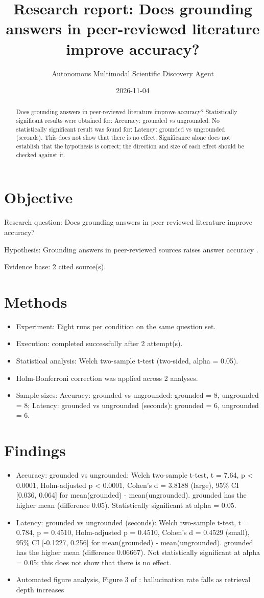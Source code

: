 \documentclass[11pt]{article}
\title{Research report: Does grounding answers in peer-reviewed literature improve accuracy?}
\author{Autonomous Multimodal Scientific Discovery Agent}
\date{2026-11-04}
\begin{document}
\maketitle
\begin{abstract}
Does grounding answers in peer-reviewed literature improve accuracy? Statistically significant results were obtained for: Accuracy: grounded vs ungrounded. No statistically significant result was found for: Latency: grounded vs ungrounded (seconds). This does not show that there is no effect. Significance alone does not establish that the hypothesis is correct; the direction and size of each effect should be checked against it.
\end{abstract}
\section{Objective}
Research question: Does grounding answers in peer-reviewed literature improve accuracy?

Hypothesis: Grounding answers in peer-reviewed sources raises answer accuracy \cite{src1}\cite{src2}.

Evidence base: 2 cited source(s).

\section{Methods}
\begin{itemize}
\item Experiment: Eight runs per condition on the same question set.
\item Execution: completed successfully after 2 attempt(s).
\item Statistical analysis: Welch two-sample t-test (two-sided, alpha = 0.05).
\item Holm-Bonferroni correction was applied across 2 analyses.
\item Sample sizes: Accuracy: grounded vs ungrounded: grounded = 8, ungrounded = 8; Latency: grounded vs ungrounded (seconds): grounded = 6, ungrounded = 6.
\end{itemize}
\section{Findings}
\begin{itemize}
\item Accuracy: grounded vs ungrounded: Welch two-sample t-test, t = 7.64, p < 0.0001, Holm-adjusted p < 0.0001, Cohen's d = 3.8188 (large), 95\% CI [0.036, 0.064] for mean(grounded) - mean(ungrounded). grounded has the higher mean (difference 0.05). Statistically significant at alpha = 0.05.
\item Latency: grounded vs ungrounded (seconds): Welch two-sample t-test, t = 0.784, p = 0.4510, Holm-adjusted p = 0.4510, Cohen's d = 0.4529 (small), 95\% CI [-0.1227, 0.256] for mean(grounded) - mean(ungrounded). grounded has the higher mean (difference 0.06667). Not statistically significant at alpha = 0.05; this does not show that there is no effect.
\item Automated figure analysis, Figure 3 of \cite{src2}: hallucination rate falls as retrieval depth increases
\end{itemize}
\end{document}
